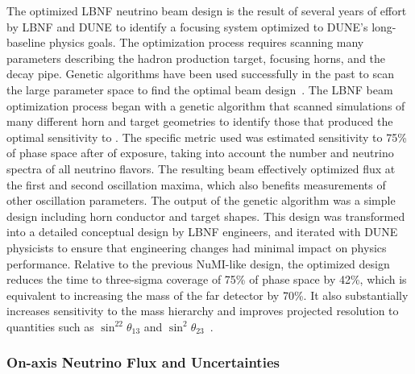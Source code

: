 The optimized LBNF neutrino beam design is the result of several years of effort by LBNF and DUNE to identify a focusing system optimized to DUNE's long-baseline physics goals.  The optimization process requires scanning many parameters describing the hadron production target, focusing horns, and the decay pipe. Genetic algorithms have been used successfully in the past to scan the large parameter space to find the optimal beam design~\cite{Calviani:2014cxa}. The  LBNF beam optimization process began with a genetic algorithm that scanned simulations of many different horn and target geometries to identify those that produced the optimal sensitivity to .  The specific metric used was estimated sensitivity to 75\% of  phase space after   %
of exposure, taking into account the number and neutrino spectra of all neutrino flavors. The resulting beam effectively optimized flux at the first and second oscillation maxima, which also benefits measurements of other oscillation parameters.  The output of the genetic algorithm was a simple design including horn conductor and target shapes.  This design was transformed into a detailed conceptual design by LBNF engineers, and iterated with DUNE physicists to ensure that engineering changes had minimal impact on physics performance.  Relative to the previous NuMI-like design, the optimized design reduces the time to three-sigma coverage of 75\% of  phase space by 42\%, which is equivalent to increasing the mass of the far detector by 70\%.  It also substantially increases sensitivity to the mass hierarchy and improves projected resolution to quantities such as $\sin^22\theta_{13}$ and $\sin^2\theta_{23}$~\cite{fields_doc_2901}.        

\subsubsection{On-axis Neutrino Flux and Uncertainties}

